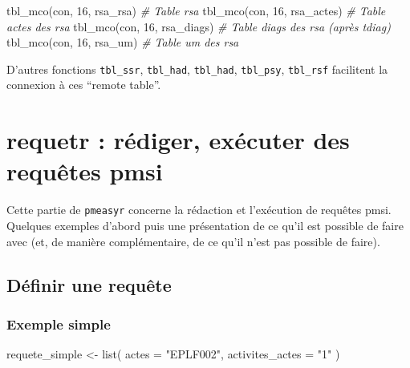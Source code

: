 \documentclass[
]{book}
\newenvironment{Shaded}{\begin{snugshade}}{\end{snugshade}}
\newcommand{\AttributeTok}[1]{\textcolor[rgb]{0.77,0.63,0.00}{#1}}
\newcommand{\CommentTok}[1]{\textcolor[rgb]{0.56,0.35,0.01}{\textit{#1}}}
\newcommand{\DecValTok}[1]{\textcolor[rgb]{0.00,0.00,0.81}{#1}}
\newcommand{\FunctionTok}[1]{\textcolor[rgb]{0.00,0.00,0.00}{#1}}
\newcommand{\NormalTok}[1]{#1}
\newcommand{\OtherTok}[1]{\textcolor[rgb]{0.56,0.35,0.01}{#1}}
\newcommand{\StringTok}[1]{\textcolor[rgb]{0.31,0.60,0.02}{#1}}
\begin{document}
\begin{Shaded}
\begin{Highlighting}[]
\FunctionTok{tbl\_mco}\NormalTok{(con, }\DecValTok{16}\NormalTok{, }\StringTok{\textquotesingle{}rsa\_rsa\textquotesingle{}}\NormalTok{) }\CommentTok{\# Table rsa}
\FunctionTok{tbl\_mco}\NormalTok{(con, }\DecValTok{16}\NormalTok{, }\StringTok{\textquotesingle{}rsa\_actes\textquotesingle{}}\NormalTok{) }\CommentTok{\# Table actes des rsa}
\FunctionTok{tbl\_mco}\NormalTok{(con, }\DecValTok{16}\NormalTok{, }\StringTok{\textquotesingle{}rsa\_diags\textquotesingle{}}\NormalTok{) }\CommentTok{\# Table diags des rsa (après \textasciigrave{}tdiag\textasciigrave{})}
\FunctionTok{tbl\_mco}\NormalTok{(con, }\DecValTok{16}\NormalTok{, }\StringTok{\textquotesingle{}rsa\_um\textquotesingle{}}\NormalTok{) }\CommentTok{\# Table um des rsa }
\end{Highlighting}
\end{Shaded}

D'autres fonctions \texttt{tbl\_ssr}, \texttt{tbl\_had}, \texttt{tbl\_had}, \texttt{tbl\_psy}, \texttt{tbl\_rsf} facilitent la connexion à ces ``remote table''.

\hypertarget{requetr-ruxe9diger-exuxe9cuter-des-requuxeates-pmsi}{%
\chapter{requetr : rédiger, exécuter des requêtes pmsi}\label{requetr-ruxe9diger-exuxe9cuter-des-requuxeates-pmsi}}

Cette partie de \texttt{pmeasyr} concerne la rédaction et l'exécution de requêtes pmsi. Quelques exemples d'abord puis une présentation de ce qu'il est possible de faire avec (et, de manière complémentaire, de ce qu'il n'est pas possible de faire).

\hypertarget{duxe9finir-une-requuxeate}{%
\section{Définir une requête}\label{duxe9finir-une-requuxeate}}

\hypertarget{exemple-simple}{%
\subsection{Exemple simple}\label{exemple-simple}}

\begin{Shaded}
\begin{Highlighting}[]
\NormalTok{requete\_simple }\OtherTok{\textless{}{-}} \FunctionTok{list}\NormalTok{(}
  \AttributeTok{actes =} \StringTok{"EPLF002"}\NormalTok{, }
  \AttributeTok{activites\_actes =} \StringTok{"1"}
\NormalTok{)}
\end{Highlighting}
\end{Shaded}
\end{document}
